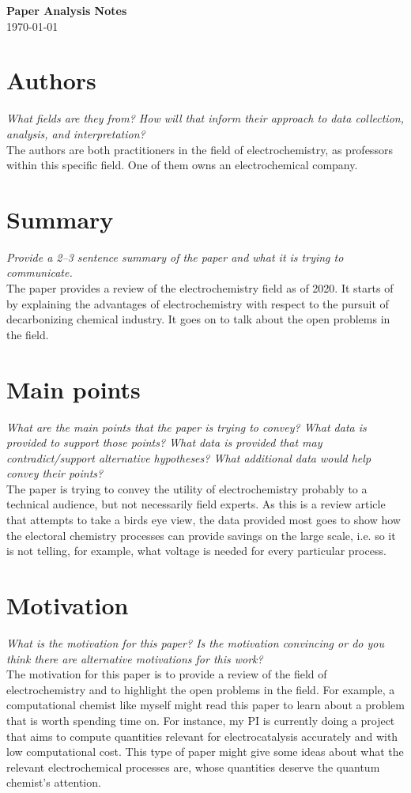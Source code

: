\documentclass[12pt]{article}
\begin{document}
\begin{center}
    {\LARGE \textbf{Paper Analysis Notes}}\\[6pt]
    \today
\end{center}


\section*{Authors}
\textit{What fields are they from? How will that inform their approach to data collection, analysis, and interpretation?}\\[4pt]
The authors are both practitioners in the field of electrochemistry, as professors within this specific field. One of them owns an electrochemical company.

\section*{Summary}
\textit{Provide a 2--3 sentence summary of the paper and what it is trying to communicate.}\\[4pt]
The paper provides a review of the electrochemistry field as of 2020. It starts of by explaining the advantages of electrochemistry with respect to the pursuit of decarbonizing chemical industry. It goes on to talk about the open problems in the field.

\section*{Main points}
\textit{What are the main points that the paper is trying to convey? What data is provided to support those points? What data is provided that may contradict/support alternative hypotheses? What additional data would help convey their points?}\\[4pt]
The paper is trying to convey the utility of electrochemistry probably to a technical audience, but not necessarily field experts. As this is a review article that attempts to take a birds eye view, the data provided most goes to show how the electoral chemistry processes can provide savings on the large scale, i.e. so it is not telling, for example, what voltage is needed for every particular process.

\section*{Motivation}
\textit{What is the motivation for this paper? Is the motivation convincing or do you think there are alternative motivations for this work?}\\[4pt]
The motivation for this paper is to provide a review of the field of electrochemistry and to highlight the open problems in the field. For example, a computational chemist like myself might read this paper to learn about a problem that is worth spending time on. For instance, my PI is currently doing a project that aims to compute quantities relevant for electrocatalysis accurately and with low computational cost. This type of paper might give some ideas about what the relevant electrochemical processes are, whose quantities deserve the quantum chemist's attention.
\end{document}
